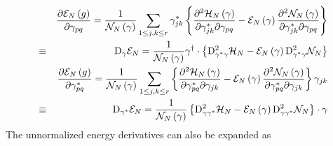 \documentclass[aps,preprint]{revtex4}
\begin{document}
\begin{eqnarray}
&&\frac{\partial \mathcal{E}_{N}\left( g\right) }{\partial \gamma _{pq}}=%
\frac{1}{\mathcal{N}_{N}\left( \mathbf{\gamma }\right) }\sum_{1\leq j,k\leq
r}\gamma _{jk}^{\ast }\left\{ \frac{\partial ^{2}\mathcal{H}_{N}\left( 
\mathbf{\gamma }\right) }{\partial \gamma _{jk}^{\ast }\partial \gamma _{pq}}%
-\mathcal{E}_{N}\left( \mathbf{\gamma }\right) \frac{\partial ^{2}\mathcal{N}%
_{N}\left( \mathbf{\gamma }\right) }{\partial \gamma _{jk}^{\ast }\partial
\gamma _{pq}}\right\}  \nonumber \\
&\equiv &\mathrm{D}_{\gamma }\mathcal{E}_{N}=\frac{1}{\mathcal{N}_{N}\left( 
\mathbf{\gamma }\right) }\mathbf{\gamma }^{\dagger }\cdot \left\{ \mathrm{D}%
_{\gamma ^{\ast }\gamma }^{2}\mathcal{H}_{N}-\mathcal{E}_{N}\left( \mathbf{%
\gamma }\right) \mathrm{D}_{\gamma ^{\ast }\gamma }^{2}\mathcal{N}%
_{N}\right\} \\
&&\frac{\partial \mathcal{E}_{N}\left( g\right) }{\partial \gamma
_{pq}^{\ast }}=\frac{1}{\mathcal{N}_{N}\left( \mathbf{\gamma }\right) }%
\sum_{1\leq j,k\leq r}\left\{ \frac{\partial ^{2}\mathcal{H}_{N}\left( 
\mathbf{\gamma }\right) }{\partial \gamma _{pq}^{\ast }\partial \gamma _{jk}}%
-\mathcal{E}_{N}\left( \mathbf{\gamma }\right) \frac{\partial ^{2}\mathcal{N}%
_{N}\left( \mathbf{\gamma }\right) }{\partial \gamma _{pq}^{\ast }\partial
\gamma _{jk}}\right\} \gamma _{jk}  \nonumber \\
&\equiv &\mathrm{D}_{\gamma ^{\ast }}\mathcal{E}_{N}=\frac{1}{\mathcal{N}%
_{N}\left( \mathbf{\gamma }\right) }\left\{ \mathrm{D}_{\gamma \gamma ^{\ast
}}^{2}\mathcal{H}_{N}-\mathcal{E}_{N}\left( \mathbf{\gamma }\right) \mathrm{D%
}_{\gamma \gamma ^{\ast }}^{2}\mathcal{N}_{N}\right\} \cdot \mathbf{\gamma }
\end{eqnarray}%
The unnormalized energy derivatives can also be expanded as 
\end{document}
